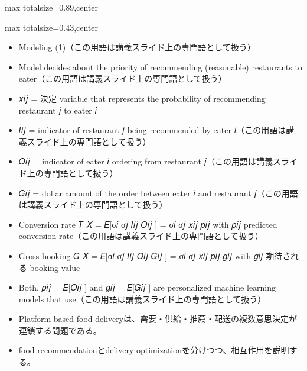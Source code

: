 \begin{minipage}[t]{0.58\textwidth}
\begin{adjustbox}{max totalsize={\textwidth}{0.89\textheight},center}
\begin{minipage}{\textwidth}
\end{minipage}
\end{adjustbox}
\end{minipage}


\clearpage
{}
\begin{minipage}[t]{0.405\textwidth}
\begin{adjustbox}{max totalsize={\textwidth}{0.43\textheight},center}
\begin{minipage}{\textwidth}\scriptsize
{}\begin{itemize}
\item Modeling (1)（この用語は講義スライド上の専門語として扱う）
\item Model decides about the priority of recommending (reasonable) restaurants to eater（この用語は講義スライド上の専門語として扱う）
\item 𝑥𝑖𝑗 = 決定 variable that represents the probability of recommending restaurant 𝑗 to eater 𝑖
\item 𝐼𝑖𝑗 = indicator of restaurant 𝑗 being recommended by eater 𝑖（この用語は講義スライド上の専門語として扱う）
\item 𝑂𝑖𝑗 = indicator of eater 𝑖 ordering from restaurant 𝑗（この用語は講義スライド上の専門語として扱う）
\item 𝐺𝑖𝑗 = dollar amount of the order between eater 𝑖 and restaurant 𝑗（この用語は講義スライド上の専門語として扱う）
\item Conversion rate 𝑇 𝑋 = 𝐸[σ𝑖 σ𝑗 𝐼𝑖𝑗 𝑂𝑖𝑗 ] = σ𝑖 σ𝑗 𝑥𝑖𝑗 𝑝𝑖𝑗 with 𝑝𝑖𝑗 predicted conversion rate（この用語は講義スライド上の専門語として扱う）
\item Gross booking 𝐺 𝑋 = 𝐸[σ𝑖 σ𝑗 𝐼𝑖𝑗 𝑂𝑖𝑗 𝐺𝑖𝑗 ] = σ𝑖 σ𝑗 𝑥𝑖𝑗 𝑝𝑖𝑗 𝑔𝑖𝑗 with 𝑔𝑖𝑗 期待される booking value
\item Both, 𝑝𝑖𝑗 = 𝐸[𝑂𝑖𝑗 ] and 𝑔𝑖𝑗 = 𝐸[𝐺𝑖𝑗 ] are personalized machine learning models that use（この用語は講義スライド上の専門語として扱う）
\end{itemize}\begin{itemize}
\item Platform-based food deliveryは、需要・供給・推薦・配送の複数意思決定が連鎖する問題である。
\item food recommendationとdelivery optimizationを分けつつ、相互作用を説明する。
\end{itemize}
\end{minipage}
\end{adjustbox}
\end{minipage}\hfill
